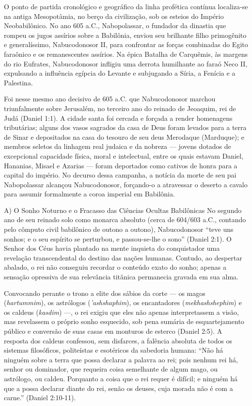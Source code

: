 O ponto de partida cronológico e geográfico da linha profética contínua localiza-se na antiga Mesopotâmia, no berço da civilização, sob os esteios do Império Neobabilônico. No ano 605 a.C., Nabopolassar, o fundador da dinastia que rompeu os jugos assírios sobre a Babilônia, enviou seu brilhante filho primogênito e generalíssimo, Nabucodonosor II, para confrontar as forças combinadas do Egito faraônico e os remanescentes assírios. Na épica Batalha de Carquêmis, às margens do rio Eufrates, Nabucodonosor infligiu uma derrota humilhante ao faraó Neco II, expulsando a influência egípcia do Levante e subjugando a Síria, a Fenícia e a Palestina.

Foi nesse mesmo ano decisivo de 605 a.C. que Nabucodonosor marchou triunfalmente sobre Jerusalém, no terceiro ano do reinado de Jeoaquim, rei de Judá (Daniel 1:1). A cidade santa foi cercada e forçada a render homenagens tributárias; alguns dos vasos sagrados da casa de Deus foram levados para a terra de Sinar e depositados na casa do tesouro de seu deus Merodaque (Marduque); e membros seletos da linhagem real judaica e da nobreza — jovens dotados de excepcional capacidade física, moral e intelectual, entre os quais estavam Daniel, Hananias, Misael e Azarias — foram deportados como cativos de honra para a capital do império. No decurso dessa campanha, a notícia da morte de seu pai Nabopolassar alcançou Nabucodonosor, forçando-o a atravessar o deserto a cavalo para assumir formalmente a coroa imperial em Babilônia.

A) O Sonho Noturno e o Fracasso das Ciências Ocultas Babilônicas
No segundo ano de seu reinado solo como monarca absoluto (cerca de 604/603 a.C., contando pelo cômputo civil babilônico de outono a outono), Nabucodonosor ``teve uns sonhos; e o seu espírito se perturbou, e passou-se-lhe o sono'' (Daniel 2:1). O Senhor dos Céus havia plantado na mente inquieta do conquistador uma revelação transcendental do destino das nações humanas. Contudo, ao despertar abalado, o rei não conseguiu recordar o conteúdo exato do sonho; apenas a sensação opressiva de sua relevância titânica permanecia gravada em sua alma.

Convocando perante o trono a elite dos sábios da corte — os magos (\textit{hartummim}), os astrólogos (\textit{'ashshaphim}), os encantadores (\textit{mekhashshephim}) e os caldeus (\textit{kasdim}) —, o rei exigiu que eles não apenas interpretassem a visão, mas revelassem o próprio sonho esquecido, sob pena sumária de esquartejamento público e conversão de suas casas em monturos de esterco (Daniel 2:5). A resposta dos caldeus confessou, sem disfarces, a falência absoluta de todos os sistemas filosóficos, politeístas e esotéricos da sabedoria humana:
``Não há ninguém sobre a terra que possa declarar a palavra ao rei; pois nenhum rei há, senhor ou dominador, que requeira coisa semelhante de algum mago, ou astrólogo, ou caldeu. Porquanto a coisa que o rei requer é difícil; e ninguém há que a possa declarar diante do rei, senão os deuses, cuja morada não é com a carne.'' (Daniel 2:10-11).

